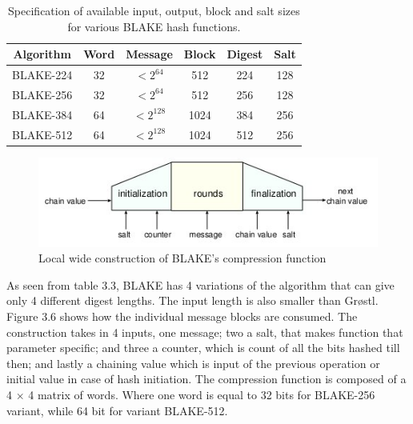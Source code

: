 \begin{table}[h]
  \begin{center}
    \begin{tabular}{ *{6}{c} } \hline
      Algorithm & Word & Message    & Block & Digest & Salt \\ \hline
      BLAKE-224 & 32   & $< 2^{64}$  & 512   & 224    & 128  \\
      BLAKE-256 & 32   & $< 2^{64}$  & 512   & 256    & 128  \\
      BLAKE-384 & 64   & $< 2^{128}$ & 1024  & 384    & 256  \\
      BLAKE-512 & 64   & $< 2^{128}$ & 1024  & 512    & 256  \\ \hline
    \end{tabular}
    \caption{Specification of available input, output, block and salt sizes for various BLAKE hash functions.\cite{00002}}
  \end{center}
\end{table}

\begin{figure}[h]
  \begin{center}
    \includegraphics[width=4.75in]{blakelocalwidepipeconstruction.jpg}
  \end{center}
  \caption{Local wide construction of BLAKE's compression function\cite{00002}}
  \label{fig:lab}
\end{figure}

As seen from table 3.3, BLAKE has 4 variations of the algorithm that can give only 4 different digest lengths. The input
length is also smaller than Gr{\o}stl. Figure 3.6 shows how the individual message blocks are consumed. The construction
takes in 4 inputs, one message; two a salt, that makes function that parameter specific; and three a counter, which is 
count of all the bits hashed till then; and lastly a chaining value which is input of the previous operation or initial
value in case of hash initiation. The compression function is composed of a 4 $\times$ 4 matrix of words. Where one word is 
equal to 32 bits for BLAKE-256 variant, while 64 bit for variant BLAKE-512.

